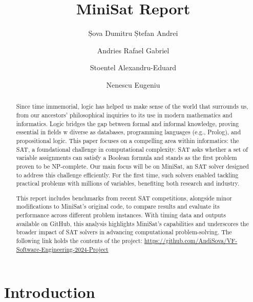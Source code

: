 \documentclass[runningheads]{llncs}
\begin{document}
%
\title{MiniSat Report}
%
%
\author{Șova Dumitru Ștefan Andrei \and
Andries Rafael Gabriel \and
Stoentel Alexandru-Eduard \and Nenescu Eugeniu}
%
%
%
\maketitle              %
%
\begin{abstract}

Since time immemorial, logic has helped us make sense of the world that surrounds us, from our ancestors' philosophical inquiries to its use in modern mathematics and informatics. Logic bridges the gap between formal and informal knowledge, proving essential in fields w diverse as databases, programming languages (e.g., Prolog), and propositional logic. This paper focuses on a compelling area within informatics: the \ac{SAT}, a foundational challenge in computational complexity. SAT asks whether a set of variable assignments can satisfy a Boolean formula and stands as the first problem proven to be NP-complete. Our main focus will be on MiniSat, an SAT solver designed to address this challenge efficiently. For the first time, such solvers enabled tackling practical problems with millions of variables, benefiting both research and industry.

This report includes benchmarks from recent SAT competitions, alongside minor modifications to MiniSat’s original code, to compare results and evaluate its performance across different problem instances. With timing data and outputs available on GitHub, this analysis highlights MiniSat’s capabilities and underscores the broader impact of SAT solvers in advancing computational problem-solving. The following link holds the contents of the project: \url{https://github.com/AndiSova/VF-Software-Engineering-2024-Project}

\end{abstract}
%
%
%
\section{Introduction}
\end{document}
